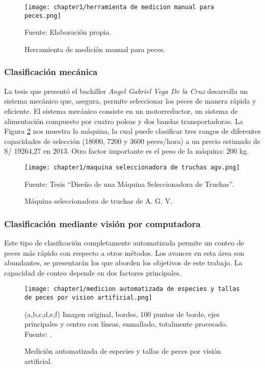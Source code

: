 \begin{figure}[H]
	\centering
	\texttt{[image: chapter1/herramienta de medicion manual para peces.png]}
	\caption{Herramienta de medición manual para peces.}
	Fuente: Elaboración propia.
	\label{fig:herramienta de medicion manual para peces}
\end{figure}

\subsubsection{Clasificación mecánica}

La tesis que presentó el bachiller \textit{Angel Gabriel Vega De la Cruz} desarrolla un sistema mecánico que, asegura, permite seleccionar los peces de manera rápida y eficiente. El sistema mecánico consiste en un motorreductor, un sistema de alimentación compuesto por cuatro poleas y dos bandas transportadoras. La Figura \ref{fig:maquina seleccionadora de truchas agv} nos muestra la máquina, la cual puede clasificar tres rangos de  diferentes capacidades de selección (18000, 7200 y 3600 peces/hora) a un precio estimado de S/ 19264,27 en 2013. Otro factor importante es el peso de la máquina: 200 kg.\cite[p.~2,105]{Vega2013}\\

\begin{figure}[H]
	\centering
	\texttt{[image: chapter1/maquina seleccionadora de truchas agv.png]}
	\caption{Máquina seleccionadora de truchas de A. G. V.}
	Fuente: Tesis “Diseño de una Máquina Seleccionadora de Truchas”.
	\label{fig:maquina seleccionadora de truchas agv}
\end{figure}

\subsubsection{Clasificación mediante visión por computadora}

Este tipo de clasificación completamente automatizada permite un conteo de peces más rápido con respecto a otros métodos. Los avances en esta área son abundantes, se presentarán los que aborden los objetivos de este trabajo. La capacidad de conteo depende en dos factores principales. \cite[p.~2-3]{Niu2018}

\begin{figure}[H]
	\centering
	\texttt{[image: chapter1/medicion automatizada de especies y tallas de peces por vision artificial.png]}
	\caption{Medición automatizada de especies y tallas de peces por visión artificial.}
	(a,b,c,d,e,f) Imagen original, bordes, 100 puntos de borde, ejes principales y centro con líneas, enmallado, totalmente procesado.\\
	Fuente: \cite[p.~4]{White2006}.
	\label{fig:medicion automatizada de especies y tallas de peces por vision artificial}
\end{figure}

